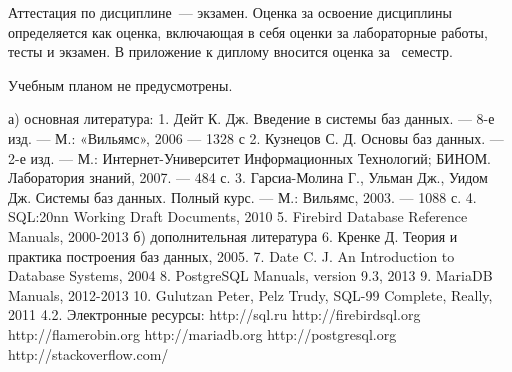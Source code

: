 \documentclass[a4paper]{article}
\begin{document}
\begin{CourseMarkCriteria}
\end{CourseMarkCriteria}

Аттестация по дисциплине~— экзамен.
Оценка за освоение дисциплины определяется как оценка, включающая в себя оценки за лабораторные работы, тесты и экзамен.
В приложение к диплому вносится оценка за \CourseExamSemester\ семестр.

\CourseWorksSection

Учебным планом не предусмотрены.

\CourseLiteratureSection

а) основная литература:
1.  Дейт К. Дж. Введение в системы баз данных. — 8-е изд. — М.: «Вильямс», 2006 — 1328 с
2.  Кузнецов С. Д. Основы баз данных. — 2-е изд. — М.: Интернет-Университет Информационных Технологий; БИНОМ. Лаборатория знаний, 2007. — 484 с.
3.  Гарсиа-Молина Г., Ульман Дж., Уидом Дж. Системы баз данных. Полный курс. — М.: Вильямс, 2003. — 1088 с.
4.  SQL:20nn Working Draft Documents, 2010
5.  Firebird Database Reference Manuals, 2000-2013
б) дополнительная литература
6.  Кренке Д. Теория и практика построения баз данных, 2005.
7.  Date C. J. An Introduction to Database Systems, 2004
8.  PostgreSQL Manuals, version 9.3, 2013
9.  MariaDB Manuals, 2012-2013
10.  Gulutzan Peter,  Pelz Trudy, SQL-99 Complete, Really, 2011
4.2. Электронные  ресурсы:
http://sql.ru
http://firebirdsql.org
http://flamerobin.org
http://mariadb.org
http://postgresql.org
http://stackoverflow.com/
\end{document}
